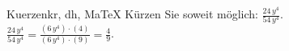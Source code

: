 \begin{MAufgabe}{Kuerzen}{kr, dh, MaTeX}
K\"urzen Sie soweit m\"oglich: $\frac{24\, y^4}{54\, y^4}$.\\ 
\ifLsg\MLoesung
\quad $\frac{24\, y^4}{54\, y^4}=\frac{(6\, y^4)\cdot(4)}{(6\, y^4)\cdot(9)}=\frac{4}{9}$.\else\relax\fi
 \end{MAufgabe}